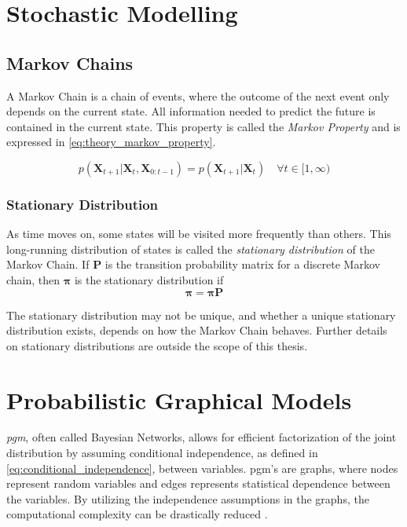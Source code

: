 \section{Stochastic Modelling}

\subsection{Markov Chains}
A Markov Chain is a chain of events, where the outcome of the next event only depends on the current state. All information needed to predict the future is contained in the current state. This property is called the \textit{Markov Property} and is expressed in \cref{eq:theory_markov_property}.

\begin{equation}\label{eq:theory_markov_property}
p(\mathbf{X}_{t+1} | \mathbf{X}_t,  \mathbf{X}_{0:t-1}) = p(\mathbf{X}_{t+1} | \mathbf{X}_t)  \quad \forall t \in [1, \infty)
\end{equation}

\subsubsection{Stationary Distribution}
As time moves on, some states will be visited more frequently than others. This long-running distribution of states is called the \textit{stationary distribution} of the Markov Chain. If $\mathbf{P}$ is the transition probability matrix for a discrete Markov chain, then $\boldsymbol{\pi}$ is the stationary distribution if 
\begin{equation}\label{eq:markov_stationary}
    \boldsymbol{\pi} = \boldsymbol{\pi} \mathbf{P}
\end{equation}

The stationary distribution may not be unique, and whether a unique stationary distribution exists, depends on how the Markov Chain behaves. Further details on stationary distributions are outside the scope of this thesis. 



\section{Probabilistic Graphical Models}
\textit{\acrfull{pgm}}, often called Bayesian Networks, allows for efficient factorization of the joint distribution by assuming conditional independence, as defined in \cref{eq:conditional_independence}, between variables. \acrshort{pgm}'s are graphs, where nodes represent random variables and edges represents statistical dependence between the variables. By utilizing the independence assumptions in the graphs, the computational complexity can be drastically reduced \cite{murphy}.

